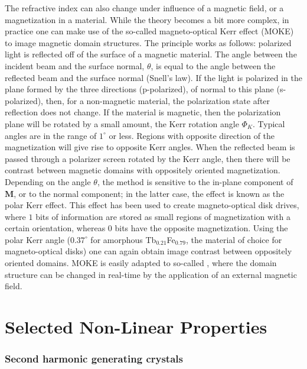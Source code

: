 The refractive index can also change under influence of a magnetic field, or a magnetization in a material.  While the theory becomes a bit more complex, in practice one can make use of the so-called magneto-optical Kerr effect (MOKE) to image magnetic domain structures.  The principle works as follows:  polarized light is reflected off of the surface of a magnetic material.  The angle between the incident beam and the surface normal, $\theta$, is equal to the angle between the reflected beam and the surface normal (Snell's law).  If the light is polarized in the plane formed by the three directions (p-polarized), of normal to this plane (s-polarized), then, for a non-magnetic material, the polarization state after reflection does not change. If the material is magnetic, then the polarization plane will be rotated by a small amount, the Kerr rotation angle $\Phi_K$. Typical angles are in the range of $1^{\circ}$ or less.  Regions with opposite direction of the magnetization will give rise to opposite Kerr angles.  When the reflected beam is passed through a polarizer screen rotated by the Kerr angle, then there will be contrast between magnetic domains with oppositely oriented magnetization.  Depending on the angle $\theta$, the  method is sensitive to the in-plane component of $\mathbf{M}$, or to the normal component; in the latter case, the effect is known as the polar Kerr effect.  This effect has been used to create magneto-optical disk drives, where $1$ bits of information are stored as small regions of magnetization with a certain orientation, whereas $0$ bits have the opposite magnetization. Using the polar Kerr angle ($0.37^{\circ}$ for amorphous Tb$_{0.21}$Fe$_{0.79}$, the material of choice for magneto-optical disks) one can again obtain image contrast between oppositely oriented domains.  MOKE is easily adapted to so-called , where the domain structure can be changed in real-time by the application of an external magnetic field.



\section{Selected Non-Linear Properties}\label{\chabbr:sec:nonlinear}

\subsubsection{Second harmonic generating crystals}


